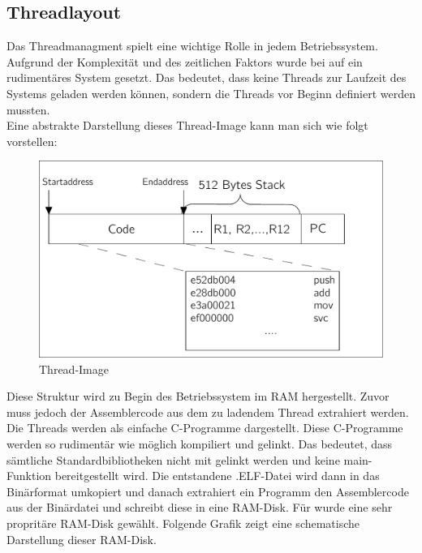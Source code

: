 \subsection{Threadlayout}
Das Threadmanagment spielt eine wichtige Rolle in jedem Betriebssystem. Aufgrund der Komplexit\"at und des zeitlichen Faktors wurde bei \mops auf ein rudiment\"ares System gesetzt. Das bedeutet, dass keine Threads zur Laufzeit des Systems geladen werden k\"onnen, sondern die Threads vor Beginn definiert werden mussten.\\
Eine abstrakte Darstellung dieses Thread-Image kann man sich wie folgt vorstellen:
\begin{figure}[H]
	\begin{center}	
	\caption{Thread-Image}
	\includegraphics[scale=0.60]{common/threadimage.pdf}
	\end{center}
\end{figure}
\noindent
Diese Struktur wird zu Begin des Betriebssystem im RAM hergestellt. Zuvor muss jedoch der Assemblercode aus dem zu ladendem Thread extrahiert werden. Die Threads werden als einfache C-Programme dargestellt. Diese C-Programme werden so rudiment\"ar wie m\"oglich kompiliert und gelinkt. Das bedeutet, dass s\"amtliche Standardbibliotheken nicht mit gelinkt werden und keine main-Funktion bereitgestellt wird. Die entstandene .ELF-Datei wird dann in das Bin\"arformat umkopiert und danach extrahiert ein Programm den Assemblercode aus der Bin\"ardatei und schreibt diese in eine RAM-Disk. F\"ur \mops wurde eine sehr proprit\"are RAM-Disk gew\"ahlt. Folgende Grafik zeigt eine schematische Darstellung dieser RAM-Disk. 
